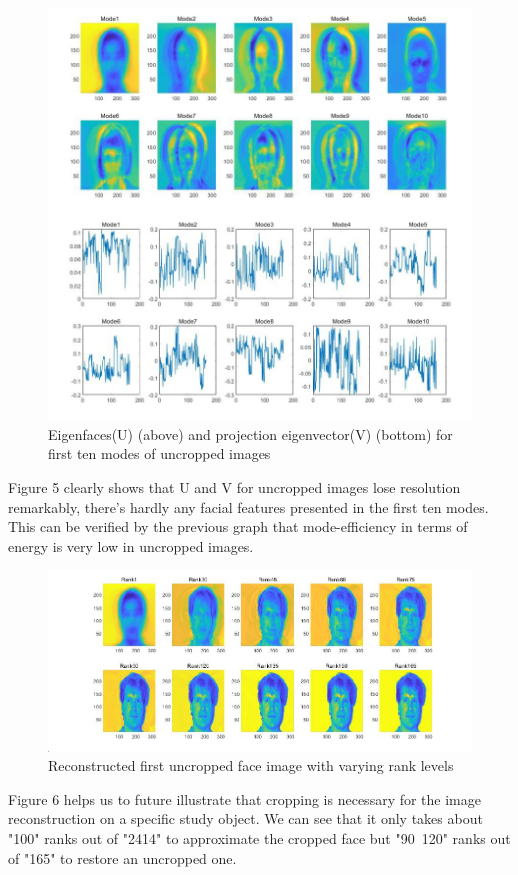 \documentclass[11pt,a4paper]{article}
\numberwithin{equation}{subsection}
\begin{document}
\begin{figure}[H]
\begin{center}
\includegraphics[scale=0.40]{U2V2.jpg}
\caption{Eigenfaces(U) (above) and projection eigenvector(V) (bottom) for first ten modes of uncropped images}
\end{center}
\end{figure}
Figure 5 clearly shows that U and V for uncropped images lose resolution remarkably, there's hardly any facial features presented in the first ten modes. This can be verified by the previous graph that mode-efficiency in terms of energy is very low in uncropped images.  
\begin{figure}[H]
\begin{center}
\includegraphics[scale=0.42]{Mres.jpg}
\caption{Reconstructed first uncropped face image with varying rank levels}
\end{center}
\end{figure}
Figure 6 helps us to future illustrate that cropping is necessary  for the image reconstruction on a specific study object. We can see that it only takes about "100" ranks out of "2414" to approximate the cropped face but "90~120" ranks out of "165" to restore an uncropped one.
\end{document}
